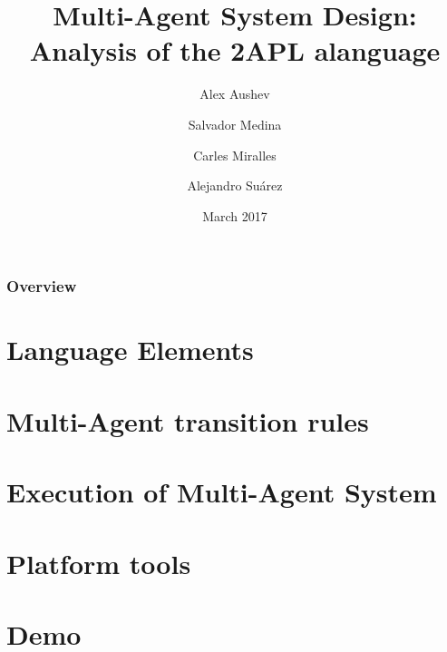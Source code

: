 \documentclass{beamer}
\title[Analysis of 2APL]{Multi-Agent System Design:\\Analysis of the 2APL alanguage} %
\author[Aushev \and Medina \and Miralles \and Su\'arez]{Alex Aushev \and Salvador Medina \and Carles Miralles \and Alejandro Su\'arez} %
\institute[UPC] %
{
Universitat Polit\`ecnica de Catalunya \\
}
\date{March 2017} %
\begin{document}
\begin{frame}
\titlepage %
\end{frame}

\begin{frame}
\frametitle{Overview} %
\tableofcontents %
\end{frame}




\section{Language Elements} 
\section{Multi-Agent transition rules}
\section{Execution of Multi-Agent System}
\section{Platform tools}
\section{Demo}
\end{document}
